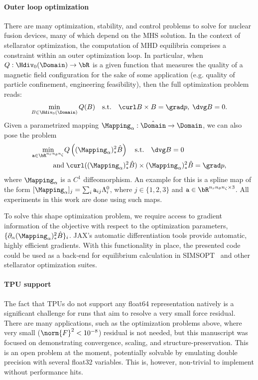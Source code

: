 \documentclass[%
 reprint,
 superscriptaddress,
 amsmath,amssymb,
 aps, nofootinbib, floatfix]{revtex4-2}
\begin{document}
\paragraph{Outer loop optimization}
There are many optimization, stability, and control problems to solve for nuclear fusion devices, many of which depend on the MHS solution. 
In the context of stellarator optimization, the computation of MHD equilibria comprises a constraint within an outer optimization loop. In particular, when $Q: \Hdiv_0(\Domain) \to \bR$ is a given function that measures the quality of a magnetic field configuration for the sake of some application (e.g. quality of particle confinement, engineering feasibility), then the full optimization problem reads:
\begin{align}
    \min_{B \in \Hdiv_0(\Domain)} Q(B) \quad \text{s.t.} \quad \curl B \times B = \grad p, \; \dvg B = 0. \notag
\end{align}
Given a parametrized mapping $\Mapping_\alpha: \hat \Domain \to \Domain$, we can also pose the problem
\begin{align}
    \min_{\mathtt{a} \in \bR^{n_r n_\theta n_\zeta}}& Q \left( (\Mapping_{\alpha})^2_* \hat B \right) \quad  \text{s.t.} \quad  \dvg B = 0 \\ \notag \text{and}& \; \curl ((\Mapping_{\alpha})^2_* \hat B) \times (\Mapping_{\alpha})^2_* \hat B = \grad p, \notag   
\end{align}
where $\Mapping_{\alpha}$ is a $C^1$ diffeomorphism. An example for this is a spline map of the form $[ \Mapping_{\alpha} ]_j = \sum_i \mathtt{a}_{ij} \Lambda_i^0$, where $j \in \{ 1, 2, 3 \}$ and $\mathtt{a} \in \bR^{n_r n_\theta n_\zeta \times 3}$. All experiments in this work are done using such maps.

To solve this shape optimization problem, we require access to gradient information of the objective with respect to the optimization parameters, $\{ \partial_{\alpha} (\Mapping_{\alpha})^2_* \hat B \}_i$. JAX's automatic differentiation tools provide automatic, highly efficient gradients.   
%
With this functionality in place, the presented code could be used as a back-end for equilibrium calculation in {SIMSOPT}~\cite{landreman2021simsopt} and other stellarator optimization suites.

\paragraph{TPU support}
The fact that TPUs do not support any float64 representation natively is a significant challenge for runs that aim to resolve a very small force residual. There are many applications, such as the optimization problems above, where very small ($\norm{F}^2 < 10^{-8}$) residual is not needed, but this manuscript was focused on demonstrating convergence, scaling, and structure-preservation. This is an open problem at the moment, potentially solvable by emulating double precision with several float32 variables. This is, however, non-trivial to implement without performance hits.   
\end{document}
